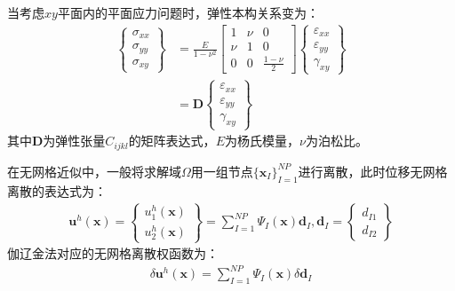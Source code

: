 当考虑$xy$平面内的平面应力问题时，弹性本构关系变为：
\begin{equation}
\begin{split}
    \left\{\begin{matrix}
        \sigma_{xx}\\\sigma_{yy}\\\sigma_{xy}
        \end{matrix}\right\}&=\frac{E}{1-\nu^2}
        \left[\begin{matrix}
        1&\nu&0\\\nu&1&0\\0&0&\frac{1-\nu}{2}
        \end{matrix}\right]
        \left\{\begin{matrix}
        \varepsilon_{xx}\\\varepsilon_{yy}\\\gamma_{xy}
    \end{matrix}\right\}\\
    &=\pmb{D}\left\{\begin{matrix}\varepsilon_{xx}\\\varepsilon_{yy}\\\gamma_{xy}\end{matrix}\right\}
\end{split}
\end{equation}
其中$\pmb{D}$为弹性张量$C_{ijkl}$的矩阵表达式，$E$为杨氏模量，$\nu$为泊松比。\par
在无网格近似中，一般将求解域$\Omega$用一组节点$\{\pmb{x}_I\}_{I=1}^{N\!P}$进行离散，此时位移无网格离散的表达式为：
\begin{equation}\label{displacement vector}
\begin{split}
    \pmb{u}^h(\pmb{x})=\left\{\begin{matrix}u_1^h(\pmb{x})\\u_2^h(\pmb{x})
    \end{matrix}\right\}=\sum_{I=1}^{N\!P}\Psi_I(\pmb{x})\pmb d_I,\pmb{d}_I=\left\{\begin{matrix}d_{I1}\\d_{I2}\end{matrix}\right\}
\end{split}
\end{equation}
伽辽金法对应的无网格离散权函数为：
\begin{equation}
\begin{split}
    \delta\pmb{u}^h(\pmb{x})=\sum_{I=1}^{N\!P}\Psi_I(\pmb{x})\delta\pmb{d}_I
\end{split}
\end{equation}
